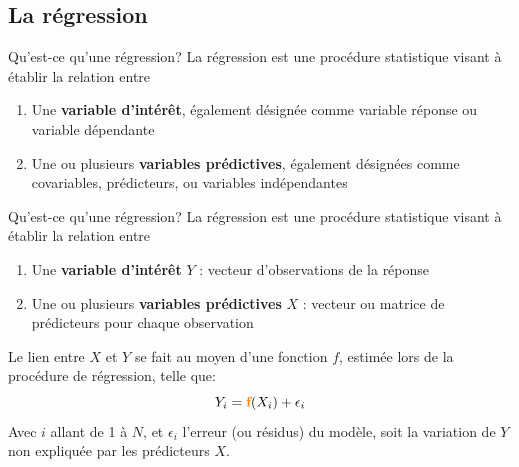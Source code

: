 \subsection{La régression}

	\begin{frame}{Qu'est-ce qu'une régression?}
	La régression est une procédure statistique visant à établir la relation entre
	
		\begin{enumerate}
		    \item Une \textbf{variable d'intérêt}, également désignée comme variable réponse ou variable dépendante
		    
		    \item Une ou plusieurs \textbf{variables prédictives}, également désignées comme covariables, prédicteurs, ou variables indépendantes
		\end{enumerate}
	\end{frame}
	
	
	\begin{frame}{Qu'est-ce qu'une régression?}
	La régression est une procédure statistique visant à établir la relation entre
	
		\begin{enumerate}
		    \item Une \textbf{variable d'intérêt} $Y$ : vecteur d'observations de la réponse
		    
		    \item Une ou plusieurs \textbf{variables prédictives} $X$ :  vecteur ou matrice de prédicteurs pour chaque observation
		\end{enumerate}
		Le lien entre $X$ et $Y$ se fait au moyen d'une fonction $f$, estimée lors de la procédure de régression, telle que:
		\Large
		\begin{equation*}
		    Y_i = \textcolor{orange}{\textbf{f}}(X_i) + \epsilon_i
		\end{equation*}
		\small
		Avec $i$ allant de 1 à $N$, et $\epsilon_i$ l'erreur (ou résidus) du modèle, soit la variation de $Y$ non expliquée par les prédicteurs $X$.

	\end{frame}
	
